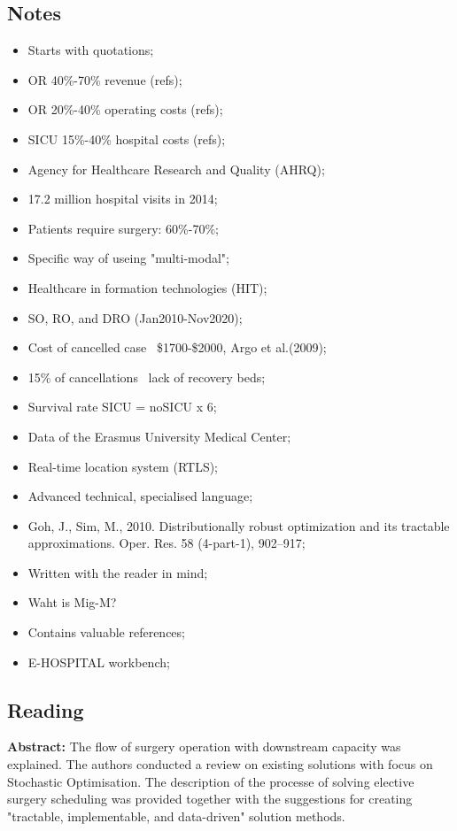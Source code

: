 \subsection{Notes}
    \begin{itemize}
        \item Starts with quotations;
        \item OR 40\%-70\% revenue (refs);
        \item OR 20\%-40\% operating costs (refs);
        \item SICU 15\%-40\% hospital costs (refs);
        \item Agency for Healthcare Research and Quality (AHRQ);
        \item 17.2 million hospital visits in 2014;
        \item Patients require surgery: 60\%-70\%;
        \item Specific way of useing "multi-modal";
        \item Healthcare in formation technologies (HIT);
        \item SO, RO, and DRO (Jan2010-Nov2020);
        \item Cost of cancelled case ~\$1700-\$2000, Argo et al.(2009);
        \item 15\% of cancellations ~lack of recovery beds;
        \item Survival rate SICU = noSICU x 6; 
        \item Data of the Erasmus University Medical Center;
        \item Real-time location system (RTLS);
        \item Advanced technical, specialised language;
        \item Goh, J., Sim, M., 2010. Distributionally robust optimization and its tractable approximations. Oper. Res. 58 (4-part-1), 902–917;
        \item Written with the reader in mind;
        \item Waht is Mig-M?
        \item Contains valuable references;
        \item E-HOSPITAL workbench;
    \end{itemize}


\subsection{Reading}
    \textbf{Abstract:}
    The flow of surgery operation with downstream capacity was explained. The authors conducted a review on existing solutions with focus on Stochastic Optimisation. The description of the processe of solving elective surgery scheduling was provided together with the suggestions for creating "tractable, implementable, and data-driven" solution methods.
    
